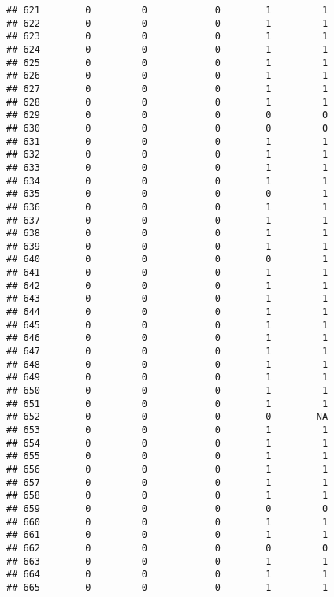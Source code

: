 \documentclass[
]{article}
\begin{document}
\begin{verbatim}
## 621        0         0            0        1         1
## 622        0         0            0        1         1
## 623        0         0            0        1         1
## 624        0         0            0        1         1
## 625        0         0            0        1         1
## 626        0         0            0        1         1
## 627        0         0            0        1         1
## 628        0         0            0        1         1
## 629        0         0            0        0         0
## 630        0         0            0        0         0
## 631        0         0            0        1         1
## 632        0         0            0        1         1
## 633        0         0            0        1         1
## 634        0         0            0        1         1
## 635        0         0            0        0         1
## 636        0         0            0        1         1
## 637        0         0            0        1         1
## 638        0         0            0        1         1
## 639        0         0            0        1         1
## 640        0         0            0        0         1
## 641        0         0            0        1         1
## 642        0         0            0        1         1
## 643        0         0            0        1         1
## 644        0         0            0        1         1
## 645        0         0            0        1         1
## 646        0         0            0        1         1
## 647        0         0            0        1         1
## 648        0         0            0        1         1
## 649        0         0            0        1         1
## 650        0         0            0        1         1
## 651        0         0            0        1         1
## 652        0         0            0        0        NA
## 653        0         0            0        1         1
## 654        0         0            0        1         1
## 655        0         0            0        1         1
## 656        0         0            0        1         1
## 657        0         0            0        1         1
## 658        0         0            0        1         1
## 659        0         0            0        0         0
## 660        0         0            0        1         1
## 661        0         0            0        1         1
## 662        0         0            0        0         0
## 663        0         0            0        1         1
## 664        0         0            0        1         1
## 665        0         0            0        1         1

\end{verbatim}
\end{document}
